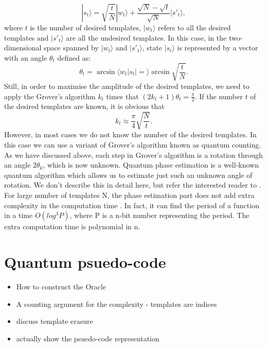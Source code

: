\documentclass[aps,prd,nofootinbib,twocolumn,reprint,superscriptaddress,showpacs,showkeys,longbibliography]{revtex4-1}
\newcommand{\ket}[1]{|#1\rangle}
\newcommand{\braket}[2]{\langle #1|#2\rangle}
\begin{document}
\begin{equation}
    \label{som}
    \ket{s_t}=\sqrt{\frac{t}{N}}\ket{w_t}+\frac{\sqrt{N}-\sqrt{t}}{\sqrt{N}}\ket{s'_t},
\end{equation}
where $t$ is the number of desired templates, $\ket{w_t}$ refers to all the desired templates and $\ket{s'_t}$ are all the undesired templates. In this case, in the two-dimensional space spanned by $\ket{w_t}$ and $\ket{s'_t}$, state $\ket{s_t}$ is represented by a vector with an angle $\theta_t$ defined as:
\begin{equation}
\label{thetat}
   \theta_t=\arcsin\braket{w_t|s_t}=\arcsin {\sqrt{\frac{t}{N}}}. 
\end{equation}
Still, in order to maximise the amplitude of the desired templates, we need to apply the Grover's algorithm $k_t$ times that $(2k_t+1)\theta_t=\frac{\pi}{2}$. If the number $t$ of the desired templates are known, it is obvious that
\begin{equation}
\label{kt}
    k_t\approx\frac{\pi}{4}\sqrt{\frac{N}{t}}.
\end{equation}
However, in most cases we do not know the number of the desired templates. In this case we can use a variant of Grover's algorithm known as quantum counting\cite{brassard1998quantum}. As we have discussed above, each step in Grover's algorithm is a rotation through an angle $2 \theta_k$, which is now unknown. Quantum phase estimation is a well-known quantum algorithm which allows us to estimate just such an unknown angle of rotation. We don't describe this in detail here, but refer the interested reader to \cite{nielsen2002quantum}. For large number of templates N, the phase estimation part does not add extra complexity in the computation time \cite{brassard1998quantum}. In fact, it can find the period of a function in a time $O(log^3P)$, where P is a n-bit number representing the period. The extra computation time is polynomial in n.\cite{barnett2009quantum}

\section{Quantum psuedo-code}\label{sec:psuedocode}

\begin{itemize}
\item How to construct the Oracle
\item A counting argument for the complexity - templates are indices
\item discuss template erasure
\item actually show the psuedo-code representation
\end{itemize}
\end{document}
